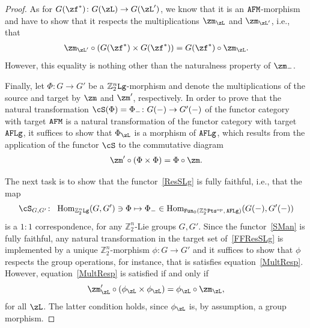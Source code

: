 \documentclass[10pt,a4paper]{amsart}
\newcommand{\op}[1]{\operatorname{#1}}
\newcommand{\Z}{{\mathbb Z}}
\newcommand{\0}{\otimes}
\newcommand{\z}{\Z_2^n}
\numberwithin{equation}{section}
\begin{document}
\begin{proof}
As for $G(\zf^*)\colon G(\zL)\to G(\zL')$, we know that it is an ${\tt AFM}$-morphism and have to show that it respects the multiplications $\zm_\zL$ and $\zm_{\zL'}$, i.e., that
\begin{gather}\label{MultRespNat}
\zm_{\zL'}\circ(G(\zf^*)\times G(\zf^*))=G(\zf^*)\circ\zm_\zL.
\end{gather}
However, this equality is nothing other than the naturalness property of $\zm_-$.

Finally, let $\Phi\colon G\to G'$ be a $\z{\tt Lg}$-morphism and denote the multiplications of the source and target by $\zm$ and $\zm'$, respectively. In order to prove that the natural transformation $\cS(\Phi)=\Phi_-\colon G(-)\to G'(-)$ of the functor category with target ${\tt AFM}$ is a natural transformation of the functor category with target ${\tt AFLg}$, it suffices to show that $\Phi_\zL$ is a morphism of ${\tt AFLg}$, which results from the application of the functor $\cS$ to the commutative diagram
\begin{gather}\label{MultResp}
\zm'\circ(\Phi\times\Phi)=\Phi\circ\zm.
\end{gather}

The next task is to show that the functor~\eqref{ResSLg} is fully faithful, i.e., that the map \begin{gather}\label{FFResSLg}
\cS_{G,G'}\colon\ \op{Hom}_{\z{\tt Lg}}(G,G')\ni\Phi\mapsto \Phi_-\in\op{Hom}_{{\tt Fun}_0(\z{\tt Pts}^{\op{op}},\,{\tt AFLg})}(G(-),G'(-))
\end{gather}
is a $1:1$ correspondence, for any $\z$-Lie groups $G,G'$. Since the functor~\eqref{SMan} is fully faithful, any natural transformation in the target set of~\eqref{FFResSLg} is implemented by a unique $\z$-morphism $\phi\colon G\to G'$ and it suffices to show that $\phi$ respects the group operations, for instance, that is satisfies equation~\eqref{MultResp}. However, equation~\eqref{MultResp} is satisfied if and only if
\[
\zm'_\zL\circ(\phi_\zL\times\phi_\zL)=\phi_\zL\circ \zm_\zL,
\]
for all $\zL$. The latter condition holds, since $\phi_\zL$ is, by assumption, a group morphism.


\end{proof}
\end{document}
